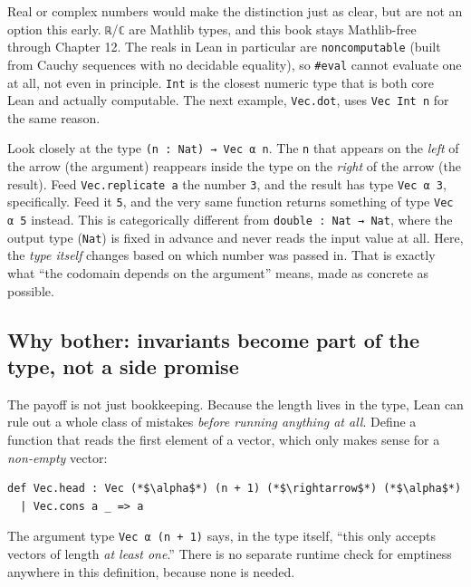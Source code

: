 Real or complex numbers would make the distinction just as clear, but are not an option this early. \texttt{ℝ}/\texttt{ℂ} are Mathlib types, and this book stays Mathlib-free through Chapter 12. The reals in Lean in particular are \texttt{noncomputable} (built from Cauchy sequences with no decidable equality), so \texttt{\#eval} cannot evaluate one at all, not even in principle. \texttt{Int} is the closest numeric type that is both core Lean and actually computable. The next example, \texttt{Vec.dot}, uses \texttt{Vec Int n} for the same reason.

Look closely at the type \texttt{(n : Nat) → Vec α n}. The \texttt{n} that appears on the \emph{left} of the arrow (the argument) reappears inside the type on the \emph{right} of the arrow (the result). Feed \texttt{Vec.replicate a} the number \texttt{3}, and the result has type \texttt{Vec α 3}, specifically. Feed it \texttt{5}, and the very same function returns something of type \texttt{Vec α 5} instead. This is categorically different from \texttt{double : Nat → Nat}, where the output type (\texttt{Nat}) is fixed in advance and never reads the input value at all. Here, the \emph{type itself} changes based on which number was passed in. That is exactly what ``the codomain depends on the argument'' means, made as concrete as possible.

\subsection{Why bother: invariants become part of the type, not a side promise}\label{sec:01-basics:03-dependent-types:5}

The payoff is not just bookkeeping. Because the length lives in the type, Lean can rule out a whole class of mistakes \emph{before running anything at all}. Define a function that reads the first element of a vector, which only makes sense for a \emph{non-empty} vector:

\begin{lstlisting}
def Vec.head : Vec (*$\alpha$*) (n + 1) (*$\rightarrow$*) (*$\alpha$*)
  | Vec.cons a _ => a
\end{lstlisting}

The argument type \texttt{Vec α (n + 1)} says, in the type itself, ``this only accepts vectors of length \emph{at least one}.'' There is no separate runtime check for emptiness anywhere in this definition, because none is needed.

